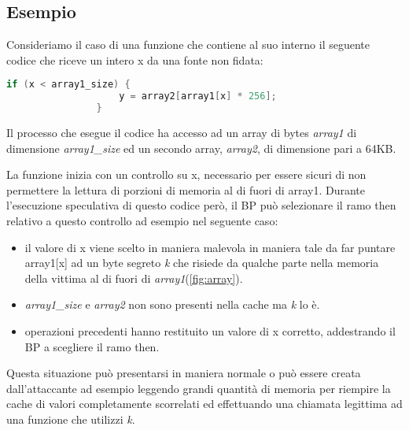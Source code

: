 		\subsection{Esempio}
		
			Consideriamo il caso di una funzione che contiene al suo interno il seguente codice che riceve un intero x da una fonte non fidata:
			
			\begin{lstlisting}[language={C}, frame={none},basicstyle={\footnotesize}]
				if (x < array1_size) {
					y = array2[array1[x] * 256];
				}
			\end{lstlisting}
			
			Il processo che esegue il codice ha accesso ad un array di bytes \emph{array1} di dimensione \emph{array1\_size} ed un secondo array, \emph{array2}, di dimensione pari a 64KB.
			
			La funzione inizia con un controllo su x, necessario per essere sicuri di non permettere la lettura di porzioni di memoria al di fuori di array1. Durante l'esecuzione speculativa di questo codice però, il \ac{BP} può selezionare il ramo then relativo a questo controllo ad esempio nel seguente caso:
			
			\begin{itemize}
				\item il valore di x viene scelto in maniera malevola in maniera tale da far puntare array1[x] ad un byte segreto \emph{k} che risiede da qualche parte nella memoria della vittima al di fuori di \emph{array1}(\cref{fig:array}).
				\item \emph{array1\_size} e \emph{array2} non sono presenti nella cache ma \emph{k} lo è.
				\item operazioni precedenti hanno restituito un valore di x corretto, addestrando il \ac{BP} a scegliere il ramo then.
			\end{itemize}
		
			Questa situazione può presentarsi in maniera normale o può essere creata dall'attaccante ad esempio leggendo grandi quantità di memoria per riempire la cache di valori completamente scorrelati ed effettuando una chiamata legittima ad una funzione che utilizzi \emph{k}.
			
